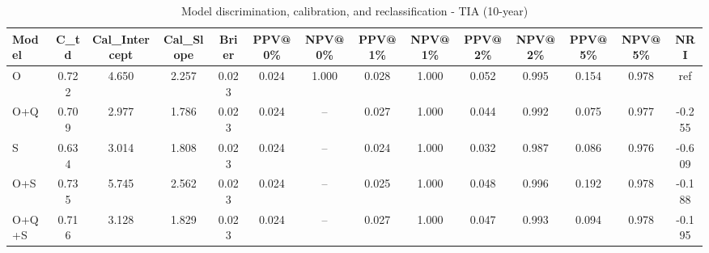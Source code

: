 \begin{table}[htbp]
\centering
\small
\caption{Model discrimination, calibration, and reclassification - TIA (10-year)}
\label{tab:perf_tia_10y}
\begin{tabular}{lccccccccccccc}
\toprule
Model & C\_td & Cal\_Intercept & Cal\_Slope & Brier & PPV@0\% & NPV@0\% & PPV@1\% & NPV@1\% & PPV@2\% & NPV@2\% & PPV@5\% & NPV@5\% & NRI \\
\midrule
O & 0.722 & 4.650 & 2.257 & 0.023 & 0.024 & 1.000 & 0.028 & 1.000 & 0.052 & 0.995 & 0.154 & 0.978 & ref \\
O+Q & 0.709 & 2.977 & 1.786 & 0.023 & 0.024 & -- & 0.027 & 1.000 & 0.044 & 0.992 & 0.075 & 0.977 & -0.255 \\
S & 0.634 & 3.014 & 1.808 & 0.023 & 0.024 & -- & 0.024 & 1.000 & 0.032 & 0.987 & 0.086 & 0.976 & -0.609 \\
O+S & 0.735 & 5.745 & 2.562 & 0.023 & 0.024 & -- & 0.025 & 1.000 & 0.048 & 0.996 & 0.192 & 0.978 & -0.188 \\
O+Q+S & 0.716 & 3.128 & 1.829 & 0.023 & 0.024 & -- & 0.027 & 1.000 & 0.047 & 0.993 & 0.094 & 0.978 & -0.195 \\
\bottomrule
\end{tabular}
\end{table}